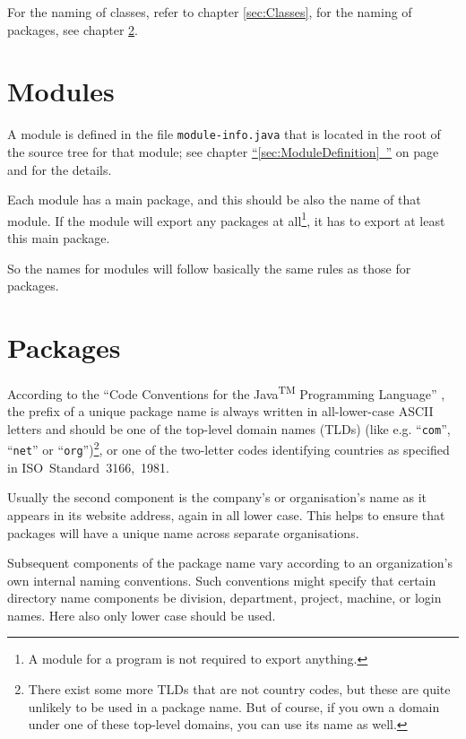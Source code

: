 \documentclass[11pt,a4paper, titlepage, parskip=half, headsepline, footsepline, cleardoublepage=current, headheight=1cm]{scrbook}
\newcommand*{\tqfullvref}[1]{\hyperref[{#1}]{“\ref*{#1}~\nameref*{#1}”} on page~\pageref{#1}}
\newcommand*{\tqref}[1]{\hyperref[{#1}]{\ref*{#1}}}
\begin{document}
For the naming of classes, refer to chapter \tqref{sec:Classes}, for the naming of packages, see chapter \tqref{sec:Packages}.


\section{Modules}\label{sec:Modules}
A module is defined in the file \verb#module-info.java# that is located in the root of the source tree for that module; see chapter \tqfullvref{sec:ModuleDefinition} and \autocite{ORACLE_DOC_LANGUAGE_SPECIFICATION:ModuleDeclarations} for the details.

Each module has a main package, and this should be also the name of that module. If the module will export any packages at all\footnote{A module for a program is not required to export anything.}, it has to export at least this main package.

So the names for modules will follow basically the same rules as those for packages.


\section{Packages}\label{sec:Packages}
According to the “Code Conventions for the Java\textsuperscript{TM} Programming Language” \autocite{SUN_CODE_CONVENTIONS}, the prefix of a unique package name is always written in all-lower-case ASCII letters and should be one of the top-level domain names (TLDs) (like e.g. “\verb#com#”, “\verb#net#” or “\verb#org#”)\footnote{There exist some more TLDs that are not country codes, but these are quite unlikely to be used in a package name. But of course, if you own a domain under one of these top-level domains, you can use its name as well.}, or one of the two-letter codes identifying countries as specified in ISO~Standard~3166,~1981.\autocite{SUN_CODE_CONVENTIONS:NamingConventions}

Usually the second component is the company's or organisation's name as it appears in its website address, again in all lower case. This helps to ensure that packages will have a unique name across separate organisations.

Subsequent components of the package name vary according to an organization's own internal naming conventions. Such conventions might specify that certain directory name components be division, department, project, machine, or login names. Here also only lower case should be used.
\end{document}
